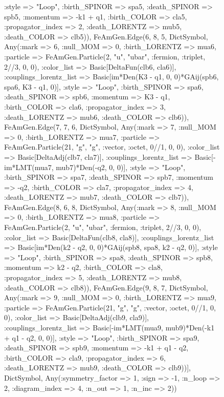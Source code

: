 \documentclass{revtex4}
\begin{document}
\begin{figure}[!htb]
\begin{center}
{:style => "Loop", :birth_SPINOR => spa5, :death_SPINOR => spb5, :momentum => -k1 + q1, :birth_COLOR => cla5, :propagator_index => 2, :death_LORENTZ => mub5, :death_COLOR => clb5)), FeAmGen.Edge(6, 8, 5, Dict{Symbol, Any}(:mark => 6, :null_MOM => 0, :birth_LORENTZ => mua6, :particle => FeAmGen.Particle(2, "u", "ubar", :fermion, :triplet, 2//3, 0, 0), :color_list => Basic[DeltaFun(clb6, cla6)], :couplings_lorentz_list => Basic[im*Den(K3 - q1, 0, 0)*GAij(spb6, spa6, K3 - q1, 0)], :style => "Loop", :birth_SPINOR => spa6, :death_SPINOR => spb6, :momentum => K3 - q1, :birth_COLOR => cla6, :propagator_index => 3, :death_LORENTZ => mub6, :death_COLOR => clb6)), FeAmGen.Edge(7, 7, 6, Dict{Symbol, Any}(:mark => 7, :null_MOM => 0, :birth_LORENTZ => mua7, :particle => FeAmGen.Particle(21, "g", "g", :vector, :octet, 0//1, 0, 0), :color_list => Basic[DeltaAdj(clb7, cla7)], :couplings_lorentz_list => Basic[-im*LMT(mua7, mub7)*Den(-q2, 0, 0)], :style => "Loop", :birth_SPINOR => spa7, :death_SPINOR => spb7, :momentum => -q2, :birth_COLOR => cla7, :propagator_index => 4, :death_LORENTZ => mub7, :death_COLOR => clb7)), FeAmGen.Edge(8, 6, 8, Dict{Symbol, Any}(:mark => 8, :null_MOM => 0, :birth_LORENTZ => mua8, :particle => FeAmGen.Particle(2, "u", "ubar", :fermion, :triplet, 2//3, 0, 0), :color_list => Basic[DeltaFun(clb8, cla8)], :couplings_lorentz_list => Basic[im*Den(k2 - q2, 0, 0)*GAij(spb8, spa8, k2 - q2, 0)], :style => "Loop", :birth_SPINOR => spa8, :death_SPINOR => spb8, :momentum => k2 - q2, :birth_COLOR => cla8, :propagator_index => 5, :death_LORENTZ => mub8, :death_COLOR => clb8)), FeAmGen.Edge(9, 8, 7, Dict{Symbol, Any}(:mark => 9, :null_MOM => 0, :birth_LORENTZ => mua9, :particle => FeAmGen.Particle(21, "g", "g", :vector, :octet, 0//1, 0, 0), :color_list => Basic[DeltaAdj(clb9, cla9)], :couplings_lorentz_list => Basic[-im*LMT(mua9, mub9)*Den(-k1 + q1 - q2, 0, 0)], :style => "Loop", :birth_SPINOR => spa9, :death_SPINOR => spb9, :momentum => -k1 + q1 - q2, :birth_COLOR => cla9, :propagator_index => 6, :death_LORENTZ => mub9, :death_COLOR => clb9))], Dict{Symbol, Any}(:symmetry_factor => 1, :sign => -1, :n_loop => 2, :diagram_index => 4, :n_out => 1, :n_inc => 2)) 
}
\end{center}
\end{figure}
\end{document}
